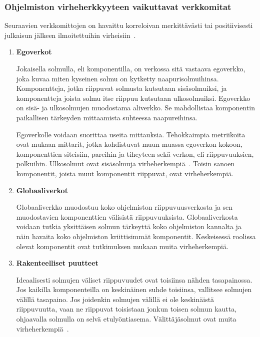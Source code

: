 \documentclass[finnish]{../tktltiki2}
\theoremstyle{definition}
\theoremstyle{remark}
\begin{document}
\subsubsection{Ohjelmiston virheherkkyyteen vaikuttavat verkkomitat}

    Seuraavien verkkomittojen on havaittu korreloivan merkittävästi tai positiivisesti julkaisun jälkeen ilmoitettuihin 
virheisiin~\cite{ZN08}.

\begin{enumerate}
    
    \item {\bf Egoverkot}
    
    Jokaisella solmulla, eli komponentilla, on verkossa sitä vastaava egoverkko, joka kuvaa miten kyseinen solmu on 
    kytketty naapurisolmuihinsa. Komponentteja, jotka riippuvat solmusta kutsutaan sisäsolmuiksi, ja komponentteja 
    joista solmu itse riippuu kutsutaan ulkosolmuiksi. Egoverkko on sisä- ja ulkosolmujen muodostama aliverkko. Se 
    mahdollistaa komponentin paikallisen tärkeyden mittaamista suhteessa naapureihinsa.
    
    Egoverkolle voidaan suorittaa useita mittauksia. Tehokkaimpia metriikoita ovat mukaan mittarit, jotka kohdistuvat 
    muun muassa egoverkon kokoon, komponenttien siteisiin, pareihin ja tiheyteen sekä verkon, eli 
    riippuvuuksien, polkuihin. Ulkosolmut ovat sisäsolmuja virheherkempiä~\cite{ZN08}. Toisin sanoen komponentit, joista 
    muut komponentit riippuvat, ovat virheherkempiä.
    
    \item {\bf Globaaliverkot}
    
    Globaaliverkko muodostuu koko ohjelmiston riippuvuusverkosta ja sen muodostavien komponenttien välisistä 
    riippuvuuksista. Globaaliverkosta voidaan tutkia yksittäisen solmun tärkeyttä koko ohjelmiston kannalta ja näin 
    havaita koko ohjelmiston kriittisimmät komponentit. Keskeisessä roolissa olevat komponentit ovat tutkimuksen mukaan 
    muita virheherkempiä.
    
    \item {\bf Rakenteelliset puutteet}
    
    Ideaalisesti solmujen väliset riippuvuudet ovat toisiinsa nähden tasapainossa. Jos kaikilla komponenteilla on 
    keskinäinen suhde toisiinsa, vallitsee solmujen välillä tasapaino. Jos joidenkin solmujen välillä ei ole keskinäistä 
    riippuvuutta, vaan ne riippuvat toisistaan jonkun toisen solmun kautta, ohjaavalla solmulla on selvä etulyöntiasema. 
    Välittäjäsolmut ovat muita virheherkempiä~\cite{ZN08}.
    

\end{enumerate}
\end{document}
